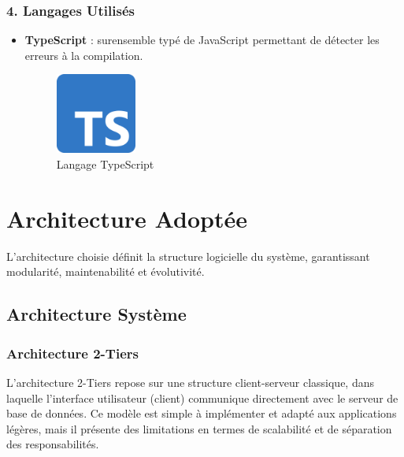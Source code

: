 \subsubsection{4. Langages Utilisés}

\begin{itemize}
    \item \textbf{TypeScript} : surensemble typé de JavaScript permettant de détecter les erreurs à la compilation.
    \begin{figure}[H]
        \centering
        \includegraphics[width=0.25\textwidth]{logos/typescript.png}
        \caption{Langage TypeScript}
    \end{figure}
\end{itemize}

\section{Architecture Adoptée}

L’architecture choisie définit la structure logicielle du système, garantissant modularité, maintenabilité et évolutivité.

\subsection{Architecture Système}
\setcounter{secnumdepth}{3}
\subsubsection{Architecture 2-Tiers}
\setcounter{secnumdepth}{3}

L'architecture 2-Tiers repose sur une structure client-serveur classique, dans laquelle l'interface utilisateur (client) communique directement avec le serveur de base de données. Ce modèle est simple à implémenter et adapté aux applications légères, mais il présente des limitations en termes de scalabilité et de séparation des responsabilités.

